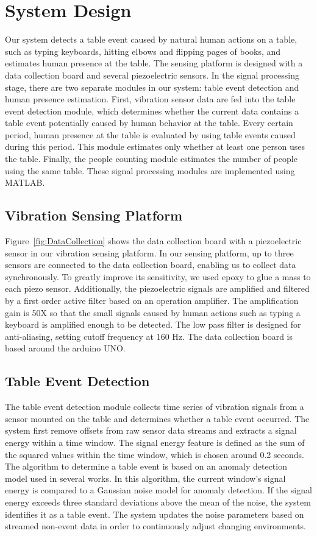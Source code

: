 \documentclass{sig-alternate-ipsn13}
\begin{document}
\section{System Design}
Our system detects a table event caused by natural human actions on a table, such as typing keyboards, hitting elbows and flipping pages of books, and estimates human presence at the table. The sensing platform is designed with a data collection board and several piezoelectric sensors. In the signal processing stage, there are two separate modules in our system: table event detection and human presence estimation. First, vibration sensor data are fed into the table event detection module, which determines whether the current data contains a table event potentially caused by human behavior at the table. Every certain period, human presence at the table is evaluated by using table events caused during this period. This module estimates only whether at least one person uses the table. Finally, the people counting module estimates the number of people using the same table. These signal processing modules are implemented using MATLAB.

\subsection{Vibration Sensing Platform}
Figure~\ref{fig:DataCollection} shows the data collection board with a piezoelectric sensor in our vibration sensing platform. In our sensing platform, up to three sensors are connected to the data collection board, enabling us to collect data synchronously. To greatly improve its sensitivity, we used epoxy to glue a mass to each piezo sensor. Additionally, the piezoelectric signals are amplified and filtered by a first order active filter based on an operation amplifier. The amplification gain is 50X so that the small signals caused by human actions such as typing a keyboard is amplified enough to be detected. The low pass filter is designed for anti-aliasing, setting cutoff frequency at 160 Hz. The data collection board is based around the arduino UNO.

\subsection{Table Event Detection}
The table event detection module collects time series of vibration signals from a sensor mounted on the table and determines whether a table event occurred. The system first remove offsets from raw sensor data streams and extracts a signal energy within a time window. The signal energy feature is defined as the sum of the squared values within the time window, which is chosen around 0.2 seconds. The algorithm to determine a table event is based on an anomaly detection model used in several works\cite{cite1}. In this algorithm, the current window’s signal energy is compared to a Gaussian noise model for anomaly detection. If the signal energy exceeds three standard deviations above the mean of the noise, the system identifies it as a table event. The system updates the noise parameters based on streamed non-event data in order to continuously adjust changing environments.
\end{document}
